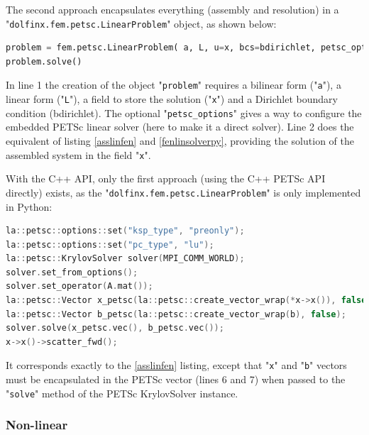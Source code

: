 \documentclass[12pt]{article}
\newcommand{\mycode}[1]{\textsf{"}\lstinline`#1`\textsf{"}}
\newcommand{\mycodepy}[1]{\textsf{"}\lstinline[language=Python]`#1`\textsf{"}}
\begin{document}
	
The second approach encapsulates everything (assembly and resolution) in a \mycodepy{dolfinx.fem.petsc.LinearProblem} object, as shown below:
\begin{lstlisting}[basicstyle=\footnotesize,language=python]
problem = fem.petsc.LinearProblem( a, L, u=x, bcs=bdirichlet, petsc_options={"ksp_type": "preonly", "pc_type": "lu"})
problem.solve()
\end{lstlisting}

In line 1 the creation of the object \mycodepy{problem} requires a bilinear form (\mycodepy{a}), a linear form (\mycodepy{L}), a field to store the solution (\mycodepy{x}) and a Dirichlet boundary condition (bdirichlet). 
The optional \mycodepy{petsc_options} gives a way to configure the embedded PETSc linear solver (here to make it a direct solver). 
Line 2 does the equivalent of listing \ref{asslinfen} and \ref{fenlinsolverpy}, providing the solution of the assembled system in the field \mycodepy{x}. 

With the C++ API, only the first approach (using the C++ PETSc API directly) exists, as the \mycodepy{dolfinx.fem.petsc.LinearProblem} is only implemented in Python:
\begin{lstlisting}[basicstyle=\footnotesize,language=c++]
la::petsc::options::set("ksp_type", "preonly");
la::petsc::options::set("pc_type", "lu");
la::petsc::KrylovSolver solver(MPI_COMM_WORLD);
solver.set_from_options();
solver.set_operator(A.mat());
la::petsc::Vector x_petsc(la::petsc::create_vector_wrap(*x->x()), false);
la::petsc::Vector b_petsc(la::petsc::create_vector_wrap(b), false);
solver.solve(x_petsc.vec(), b_petsc.vec());
x->x()->scatter_fwd();
\end{lstlisting}
It corresponds exactly to the \ref{asslinfen} listing, except that \mycode{x} and \mycode{b} vectors must be encapsulated in the PETSc vector (lines 6 and 7) when passed to the \mycode{solve} method of the PETSc KrylovSolver instance.



\subsubsection{Non-linear}
\end{document}
